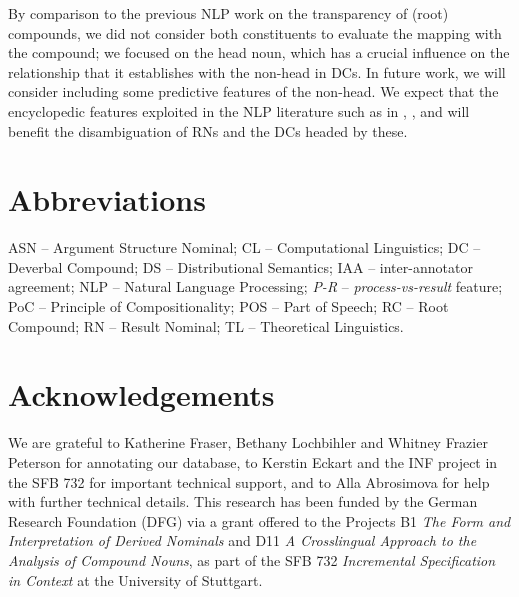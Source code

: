\documentclass[output=paper]{langsci/langscibook}
\begin{document}
By comparison to the previous NLP work on  {the transparency of (root)} compounds, we did not consider both constituents to evaluate the  mapping with the compound; we focused on the head noun, which  has a crucial influence on the relationship that it establishes with the non-head in DCs. In future work, we will consider including some predictive features of the non-head. We expect that the encyclopedic features exploited in the NLP literature such as in \cite{NicholsonBaldwin:06}, \cite{lapata:02}, and \cite{grover:lapata:lascarides:05} will benefit the disambiguation of RNs and the DCs headed by these. 


\section*{Abbreviations}
ASN -- Argument Structure Nominal; CL -- Computational Linguistics; DC -- Deverbal Compound; DS -- Distributional Semantics; IAA -- inter-annotator agreement; NLP -- Natural Language Processing; \textit{P-R} -- \textit{process-vs-result} feature; PoC -- Principle of Compositionality; POS -- Part of Speech; RC -- Root Compound; RN -- Result Nominal; TL -- Theoretical Linguistics.

\section*{Acknowledgements}
We are grateful to Katherine Fraser, Bethany Lochbihler and Whitney Frazier Peterson for annotating our database, to Kerstin Eckart and the INF project in the SFB 732 for important technical support, and to Alla Abrosimova for help with further technical details. This research has been funded by the German Research Foundation (DFG) via a grant offered to the Projects B1 \textit{The Form and Interpretation of Derived Nominals} and D11 \textit{A Crosslingual Approach to the Analysis of Compound Nouns}, as part of the SFB 732 \textit{Incremental Specification in Context} at the University of Stuttgart.



{\sloppy\printbibliography[heading=subbibliography,notkeyword=this]}
\end{document}
